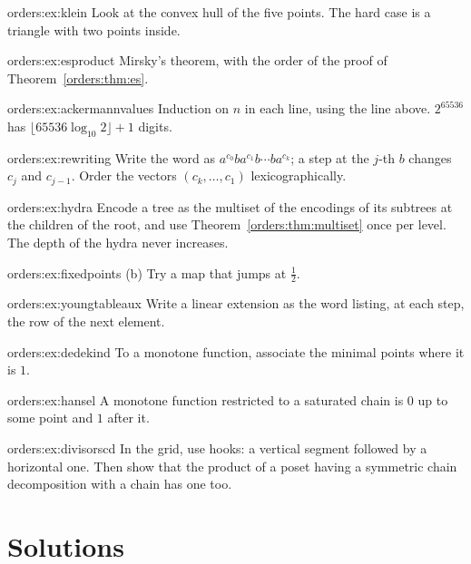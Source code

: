 \begin{hint}{orders:ex:klein}
Look at the convex hull of the five points. The hard case is a triangle with two points inside.
\end{hint}
\begin{hint}{orders:ex:esproduct}
Mirsky's theorem, with the order of the proof of Theorem~\ref{orders:thm:es}.
\end{hint}
\begin{hint}{orders:ex:ackermannvalues}
Induction on $n$ in each line, using the line above. $2^{65536}$ has $\lfloor65536\log_{10}2\rfloor+1$ digits.
\end{hint}
\begin{hint}{orders:ex:rewriting}
Write the word as $a^{c_0}ba^{c_1}b\cdots ba^{c_k}$; a step at the $j$-th $b$ changes $c_j$ and $c_{j-1}$. Order the vectors $(c_k,\dots,c_1)$
lexicographically.
\end{hint}
\begin{hint}{orders:ex:hydra}
Encode a tree as the multiset of the encodings of its subtrees at the children of the root, and use
Theorem~\ref{orders:thm:multiset} once per level. The depth of the hydra never increases.
\end{hint}
\begin{hint}{orders:ex:fixedpoints}
(b) Try a map that jumps at $\frac12$.
\end{hint}
\begin{hint}{orders:ex:youngtableaux}
Write a linear extension as the word listing, at each step, the row of the next element.
\end{hint}
\begin{hint}{orders:ex:dedekind}
To a monotone function, associate the minimal points where it is $1$.
\end{hint}
\begin{hint}{orders:ex:hansel}
A monotone function restricted to a saturated chain is $0$ up to some point and $1$ after it.
\end{hint}
\begin{hint}{orders:ex:divisorscd}
In the grid, use hooks: a vertical segment followed by a horizontal one. Then show that the product of a poset having a
symmetric chain decomposition with a chain has one too.
\end{hint}

\section{Solutions}

